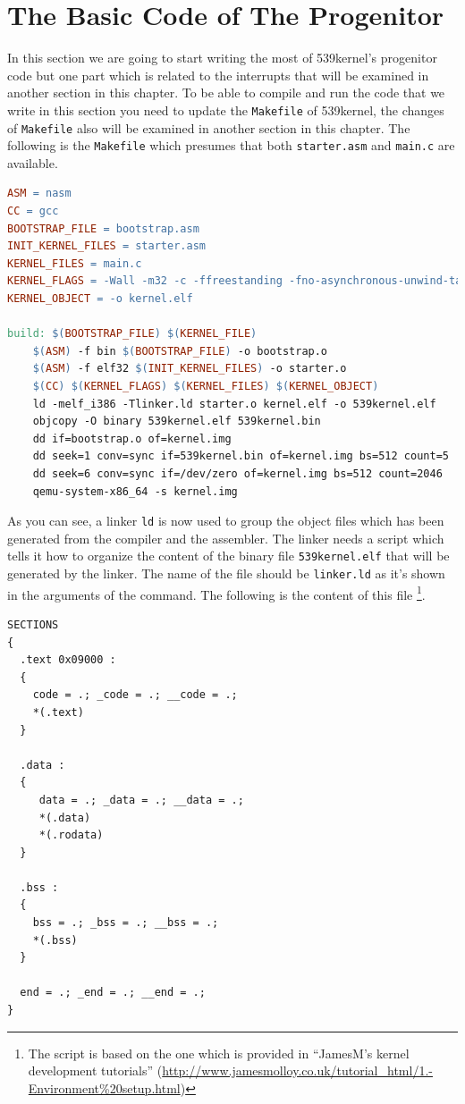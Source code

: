 \section{The Basic Code of The
Progenitor}\label{the-basic-code-of-the-progenitor}

In this section we are going to start writing the most of 539kernel's
progenitor code but one part which is related to the interrupts that
will be examined in another section in this chapter. To be able to
compile and run the code that we write in this section you need to
update the \lstinline!Makefile! of 539kernel, the changes of
\lstinline!Makefile! also will be examined in another section in this
chapter. The following is the \lstinline!Makefile! which presumes that
both \lstinline!starter.asm! and \lstinline!main.c! are available.

\begin{lstlisting}[language=make]
ASM = nasm
CC = gcc
BOOTSTRAP_FILE = bootstrap.asm 
INIT_KERNEL_FILES = starter.asm
KERNEL_FILES = main.c
KERNEL_FLAGS = -Wall -m32 -c -ffreestanding -fno-asynchronous-unwind-tables -fno-pie
KERNEL_OBJECT = -o kernel.elf

build: $(BOOTSTRAP_FILE) $(KERNEL_FILE)
    $(ASM) -f bin $(BOOTSTRAP_FILE) -o bootstrap.o
    $(ASM) -f elf32 $(INIT_KERNEL_FILES) -o starter.o 
    $(CC) $(KERNEL_FLAGS) $(KERNEL_FILES) $(KERNEL_OBJECT)
    ld -melf_i386 -Tlinker.ld starter.o kernel.elf -o 539kernel.elf
    objcopy -O binary 539kernel.elf 539kernel.bin
    dd if=bootstrap.o of=kernel.img
    dd seek=1 conv=sync if=539kernel.bin of=kernel.img bs=512 count=5
    dd seek=6 conv=sync if=/dev/zero of=kernel.img bs=512 count=2046
    qemu-system-x86_64 -s kernel.img
\end{lstlisting}

As you can see, a linker \lstinline!ld! is now used to group the object
files which has been generated from the compiler and the assembler. The
linker needs a script which tells it how to organize the content of the
binary file \lstinline!539kernel.elf! that will be generated by the
linker. The name of the file should be \lstinline!linker.ld! as it's
shown in the arguments of the command. The following is the content of
this file \footnote{The script is based on the one which is provided in
  ``JamesM's kernel development tutorials''
  (\url{http://www.jamesmolloy.co.uk/tutorial_html/1.-Environment\%20setup.html})}.

\begin{lstlisting}
SECTIONS
{
  .text 0x09000 :
  {
    code = .; _code = .; __code = .;
    *(.text)
  }

  .data :
  {
     data = .; _data = .; __data = .;
     *(.data)
     *(.rodata)
  }

  .bss :
  {
    bss = .; _bss = .; __bss = .;
    *(.bss)
  }

  end = .; _end = .; __end = .;
} 
\end{lstlisting}

